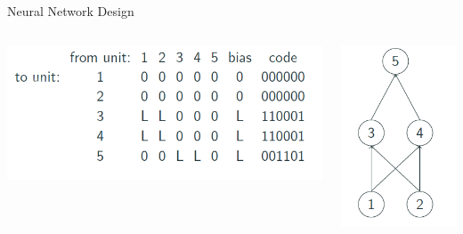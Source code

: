\documentclass{beamer}
\begin{document}
\begin{frame}{Neural Network Design}
    \begin{columns}
    \begin{column}{0.7\textwidth}

        \begin{center}
            \includegraphics[width=1.0\linewidth]{GA_images/neural-network-design.png}
        \end{center}
    \end{column}
    \begin{column}{0.4\textwidth}
        \begin{center}
              \includegraphics[width=0.8\linewidth]{GA_images/ga-neural-network.png}
        \end{center}
    \end{column}
\end{columns}
\end{frame}
\end{document}
